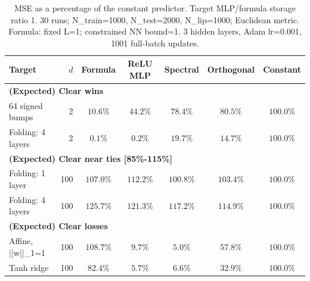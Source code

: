 \documentclass{article}
\begin{document}
\begin{table}[t]
\centering
\scriptsize
\setlength{\tabcolsep}{3pt}
\caption{MSE as a percentage of the constant predictor. Target MLP/formula storage ratio 1. 30 runs; N\_train=1000, N\_test=2000, N\_lip=1000; Euclidean metric. Formula: fixed L=1; constrained NN bound=1. 3 hidden layers, Adam lr=0.001, 1001 full-batch updates.}
\begin{tabular}{lrccccc}
\hline
Target & $d$ & Formula & ReLU MLP & Spectral & Orthogonal & Constant \\
\hline
\multicolumn{7}{l}{\textbf{(Expected) Clear wins}} \\
64 signed bumps & 2 & $10.6\%$ & $44.2\%$ & $78.4\%$ & $80.5\%$ & $100.0\%$ \\
Folding: 4 layers & 2 & $0.1\%$ & $0.2\%$ & $19.7\%$ & $14.7\%$ & $100.0\%$ \\
\hline
\multicolumn{7}{l}{\textbf{(Expected) Clear near ties [85\%-115\%]}} \\
Folding: 1 layer & 100 & $107.0\%$ & $112.2\%$ & $100.8\%$ & $103.4\%$ & $100.0\%$ \\
Folding: 4 layers & 100 & $125.7\%$ & $121.3\%$ & $117.2\%$ & $114.9\%$ & $100.0\%$ \\
\hline
\multicolumn{7}{l}{\textbf{(Expected) Clear losses}} \\
Affine, ||w||\_1=1 & 100 & $108.7\%$ & $9.7\%$ & $5.0\%$ & $57.8\%$ & $100.0\%$ \\
Tanh ridge & 100 & $82.4\%$ & $5.7\%$ & $6.6\%$ & $32.9\%$ & $100.0\%$ \\
\hline
\end{tabular}
\end{table}
\clearpage
\end{document}
